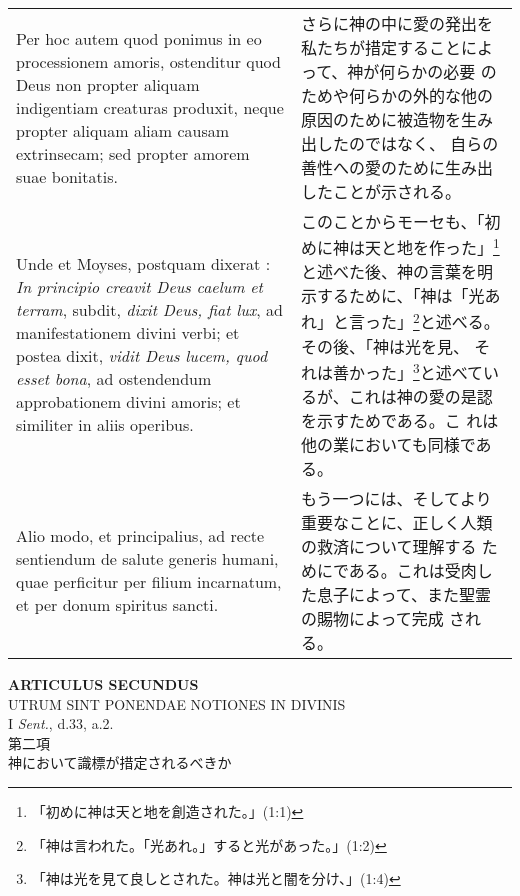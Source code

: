 \documentclass[10pt]{jsarticle} %
\begin{document}
\begin{longtable}{p{21em}p{21em}}
\\


Per hoc autem quod ponimus in eo processionem amoris,
ostenditur quod Deus non propter aliquam indigentiam creaturas
produxit, neque propter aliquam aliam causam extrinsecam; sed propter
amorem suae bonitatis. 


&

さらに神の中に愛の発出を私たちが措定することによって、神が何らかの必要
 のためや何らかの外的な他の原因のために被造物を生み出したのではなく、
 自らの善性への愛のために生み出したことが示される。

\\


Unde et Moyses, postquam dixerat : {\itshape In principio
creavit Deus caelum et terram}, subdit, {\itshape dixit Deus, fiat lux}, ad
manifestationem divini verbi; et postea dixit, {\itshape vidit Deus lucem, quod
esset bona}, ad ostendendum approbationem divini amoris; et similiter
in aliis operibus. 


&

このことからモーセも、「初めに神は天と地を作った」\footnote{「初めに神は天と地を創造された。」(1:1)}と述べた後、神の言葉を明
 示するために、「神は「光あれ」と言った」\footnote{「神は言われた。「光あれ。」すると光があった。」(1:2)}と述べる。その後、「神は光を見、
 それは善かった」\footnote{「神は光を見て良しとされた。神は光と闇を分け、」(1:4)}と述べているが、これは神の愛の是認を示すためである。こ
 れは他の業においても同様である。


\\


Alio modo, et principalius, ad recte sentiendum de
salute generis humani, quae perficitur per filium incarnatum, et per
donum spiritus sancti.

&
もう一つには、そしてより重要なことに、正しく人類の救済について理解する
 ためにである。これは受肉した息子によって、また聖霊の賜物によって完成
 される。


\end{longtable}
\newpage


\begin{center}
{\Large {\bf ARTICULUS SECUNDUS}}\\
{\large UTRUM SINT PONENDAE NOTIONES IN DIVINIS}\\
{\footnotesize I {\itshape Sent.}, d.33, a.2.}\\
{\Large 第二項\\神において識標が措定されるべきか}
\end{center}
\end{document}
